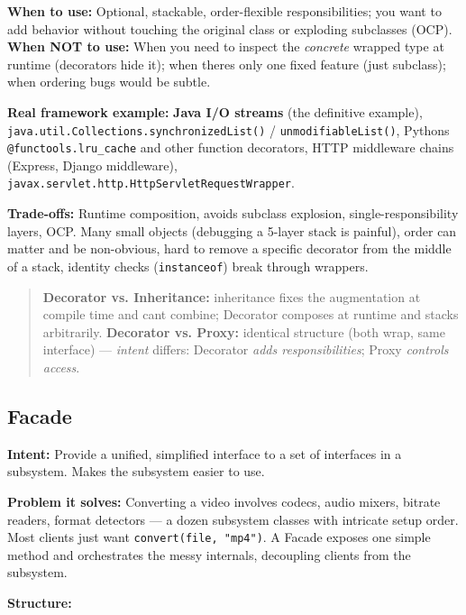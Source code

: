 \documentclass[11pt]{article}
\begin{document}
\textbf{When to use:} Optional, stackable, order-flexible responsibilities; you want to add behavior without touching the original class or exploding subclasses (OCP). \textbf{When NOT to use:} When you need to inspect the \emph{concrete} wrapped type at runtime (decorators hide it); when there\textquotesingle s only one fixed feature (just subclass); when ordering bugs would be subtle.

\textbf{Real framework example:} \textbf{Java I/O streams} (the definitive example), \texttt{java.util.Collections.synchronizedList()} / \texttt{unmodifiableList()}, Python\textquotesingle s \texttt{@functools.lru\_cache} and other function decorators, HTTP middleware chains (Express, Django middleware), \texttt{javax.servlet.http.HttpServletRequestWrapper}.

\textbf{Trade-offs:} Runtime composition, avoids subclass explosion, single-responsibility layers, OCP. Many small objects (debugging a 5-layer stack is painful), order can matter and be non-obvious, hard to remove a specific decorator from the middle of a stack, identity checks (\texttt{instanceof}) break through wrappers.

\begin{quote}
\textbf{Decorator vs. Inheritance:} inheritance fixes the augmentation at compile time and can\textquotesingle t combine; Decorator composes at runtime and stacks arbitrarily. \textbf{Decorator vs. Proxy:} identical structure (both wrap, same interface) --- \emph{intent} differs: Decorator \emph{adds responsibilities}; Proxy \emph{controls access}.
\end{quote}

\subsection{Facade}\label{facade}

\textbf{Intent:} Provide a unified, simplified interface to a set of interfaces in a subsystem. Makes the subsystem easier to use.

\textbf{Problem it solves:} Converting a video involves codecs, audio mixers, bitrate readers, format detectors --- a dozen subsystem classes with intricate setup order. Most clients just want \texttt{convert(file,\ "mp4")}. A Facade exposes one simple method and orchestrates the messy internals, decoupling clients from the subsystem.

\textbf{Structure:}

\setcodelang{}
\end{document}
